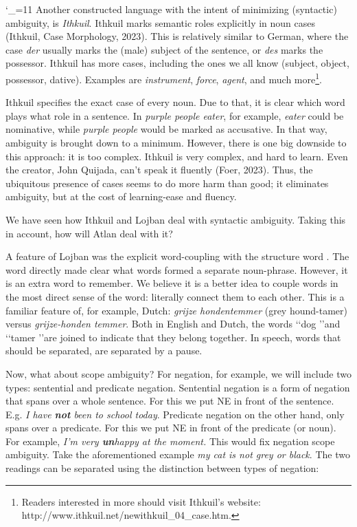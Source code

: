 \catcode`\_=11
Another constructed language with the intent of minimizing (syntactic) ambiguity, is {\it Ithkuil}. Ithkuil marks semantic roles explicitly in noun cases (Ithkuil, Case Morphology, 2023). This is relatively similar to German, where the case {\it der} usually marks the (male) subject of the sentence, or {\it des} marks the possessor. Ithkuil has more cases, including the ones we all know (subject, object, possessor, dative). Examples are {\it instrument}, {\it force}, {\it agent}, and much more\footnote{Readers interested in more should visit Ithkuil's website: http://www.ithkuil.net/newithkuil_04_case.htm.}. 


Ithkuil specifies the exact case of every noun. Due to that, it is clear which word plays what role in a sentence. In {\it purple people eater}, for example, {\it eater} could be nominative, while {\it purple people} would be marked as accusative. In that way, ambiguity is brought down to a minimum. However, there is one big downside to this approach: it is too complex. Ithkuil is very complex, and hard to learn. Even the creator, John Quijada, can't speak it fluently (Foer, 2023). Thus, the ubiquitous presence of cases seems to do more harm than good; it eliminates ambiguity, but at the cost of learning-ease and fluency.

We have seen how Ithkuil and Lojban deal with syntactic ambiguity. Taking this in account, how will Atlan deal with it?

A feature of Lojban was the explicit word-coupling with the structure word \bo. The word directly made clear what words formed a separate noun-phrase. However, it is an extra word to remember. We believe it is a better idea to couple words in the most direct sense of the word: literally connect them to each other. This is a familiar feature of, for example, Dutch: {\it grijze hondentemmer} (grey hound-tamer) versus {\it grijze-honden temmer}. Both in English and Dutch, the words \lq\lq dog \rq\rq and \lq\lq tamer \rq\rq are joined to indicate that they belong together. In speech, words that should be separated, are separated by a pause. 

Now, what about scope ambiguity? For negation, for example, we will include two types: sentential and predicate negation. Sentential negation is a form of negation that spans over a whole sentence. For this we put NE in front of the sentence. E.g. {\it I have {\bf not} been to school today}. Predicate negation on the other hand, only spans over a predicate. For this we put NE in front of the predicate (or noun). For example, {\it I'm very {\bf un}happy at the moment.} This would fix negation scope ambiguity. Take the aforementioned example {\it my cat is not grey or black}. The two readings can be separated using the distinction between types of negation:

